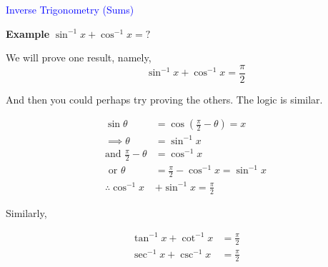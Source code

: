 \documentclass[14pt,fleqn]{extarticle}
\begin{document}
 

\begin{skill}
\textcolor{blue}{Inverse Trigonometry (Sums)}

\small{\textbf{Example} } $\sin^{-1}x + \cos^{-1} x = ?$ 
\end{skill}

\newcard 

We will prove one result, namely, 
\[ \qquad \sin^{-1} x + \cos^{-1} x = \frac\pi{2} \]

And then you could perhaps try proving the others. The logic is similar. 


\begin{align}
\sin\theta &= \cos\left( \frac\pi{2} - \theta \right) = x \\
\implies \theta &= \sin^{-1} x \\
\text{and } \frac\pi{2} - \theta &= \cos^{-1} x \\
\text{ or } \theta &= \frac\pi{2} - \cos^{-1}x = \sin^{-1} x \\
\therefore \cos^{-1}x &+ \sin^{-1}x = \frac\pi{2}  
\end{align}

Similarly, 

%
\begin{align}
\tan^{-1}x + \cot^{-1}x &= \frac\pi{2} \\ 
\sec^{-1} x + \csc^{-1} x &= \frac\pi{2} 
\end{align}
\end{document}
